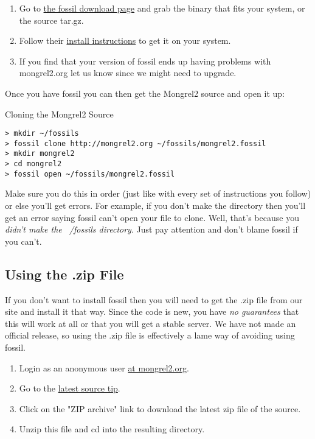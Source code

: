 \begin{enumerate}
\item Go to \href{http://www.fossil-scm.org/download.html}{the fossil download page} and
    grab the binary that fits your system, or the source tar.gz.
\item Follow their \href{http://fossil-scm.org/index.html/doc/tip/www/build.wiki}{install instructions}
    to get it on your system.
\item If you find that your version of fossil ends up having problems with mongrel2.org let us know since
    we might need to upgrade.
\end{enumerate}

Once you have fossil you can then get the Mongrel2 source and open it up:

\begin{code}{Cloning the Mongrel2 Source}
\begin{Verbatim}
> mkdir ~/fossils
> fossil clone http://mongrel2.org ~/fossils/mongrel2.fossil
> mkdir mongrel2
> cd mongrel2
> fossil open ~/fossils/mongrel2.fossil
\end{Verbatim}
\end{code}

Make sure you do this in order (just like with every set of instructions you follow)
or else you'll get errors.  For example, if you don't make the  directory
then you'll get an error saying fossil can't open your file to clone.  Well, that's because
you \emph{didn't make the ~/fossils directory}.  Just pay attention and don't blame fossil
if you can't.


\subsection{Using the .zip File}

If you don't want to install fossil then you will need to get the .zip file
from our site and install it that way.  Since the code is new, you have \emph{no guarantees}
that this will work at all or that you will get a stable server.  We have not made an
official release, so using the .zip file is effectively a lame way of avoiding using
fossil.

\begin{enumerate}
\item Login as an anonymous user \href{http://mongrel2.org/login}{at mongrel2.org}.
\item Go to the \href{http://mongrel2.org/info/tip}{latest source tip}.
\item Click on the "ZIP archive" link to download the latest zip file of the source.
\item Unzip this file and cd into the resulting directory.
\end{enumerate}


